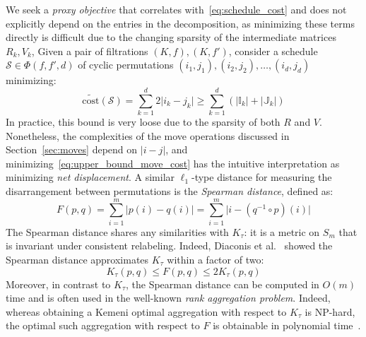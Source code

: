 \documentclass[sn-mathphys]{sn-jnl}
\begin{document}
We seek a \emph{proxy objective} that correlates with~\eqref{eq:schedule_cost} and does not explicitly depend on the entries in the decomposition, as minimizing these terms directly is difficult due to  the changing sparsity of the intermediate matrices $R_k, V_k$,  
Given a pair of filtrations $(K, f), (K,f')$, consider a schedule $\mathcal{S} \in \Phi(f,f',d)$ of cyclic permutations $(i_1, j_1), (i_2, j_2), \dots, (i_d, j_d)$ minimizing:
\begin{equation}\label{eq:upper_bound_move_cost}
\mathrm{\widetilde{cost}}(\mathcal{S}) = \sum\limits_{k=1}^d 2 \lvert i_k - j_k \rvert \geq \sum\limits_{k=1}^d ( \lvert \mathbb{I}_k \rvert + \lvert \mathbb{J}_k\rvert )
\end{equation}
In practice, this bound is very loose due to the sparsity of both $R$ and $V$. Nonetheless, the complexities of the move operations discussed in Section~\ref{sec:moves} depend on $\lvert i - j \rvert$, and minimizing~\eqref{eq:upper_bound_move_cost} has the intuitive interpretation as minimizing \emph{net displacement}. 
A similar $\ell_1$-type distance for measuring the disarrangement between permutations is the \emph{Spearman distance}, defined as:
\begin{equation}\label{eq:spearman_dist}
F(p, q) = \sum\limits_{i =1}^m \lvert p(i) - q(i) \rvert =  \sum\limits_{i =1}^m \lvert i - (q^{-1} \circ p)(i) \rvert
\end{equation}
The Spearman distance shares any similarities with $K_\tau$: it is a metric on $S_m$ that is invariant under consistent relabeling. 
Indeed, Diaconis et al.~\cite{diaconis1977spearman} showed the Spearman distance approximates $K_\tau$ within a factor of two: 
\begin{equation}\label{eq:diaconis_inequality}
K_\tau(p, q) \leq F(p, q) \leq 2 K_\tau(p, q)
\end{equation}
Moreover, in contrast to $K_\tau$, the Spearman distance can be computed in $O(m)$ time and is often used in the well-known \emph{rank aggregation problem}. Indeed, whereas obtaining a Kemeni optimal aggregation with respect to $K_\tau$ is NP-hard, the optimal such aggregation with respect to $F$ is obtainable in polynomial time~\cite{dinu2006efficient}. 
\end{document}
